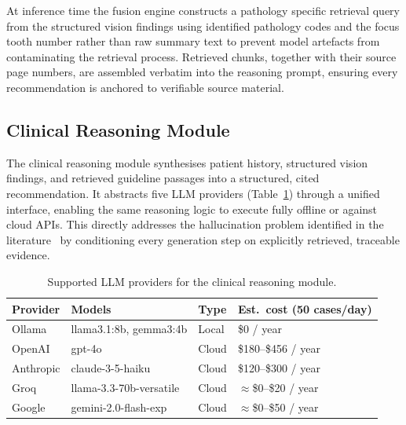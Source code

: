 \documentclass[12pt,a4paper]{report}
\begin{document}
	
	At inference time the fusion engine constructs a pathology specific retrieval query from
	the structured vision findings using identified pathology codes and the focus tooth number
	rather than raw summary text to prevent model artefacts from contaminating the retrieval
	process. Retrieved chunks, together with their source page numbers, are assembled verbatim
	into the reasoning prompt, ensuring every recommendation is anchored to verifiable source
	material.
	
	\subsection{Clinical Reasoning Module}
	\label{sec:reasoning}
	
	The clinical reasoning module synthesises patient history, structured vision findings, and
	retrieved guideline passages into a structured, cited recommendation. It abstracts five LLM
	providers (Table~\ref{tab:llm_providers}) through a unified interface, enabling the same
	reasoning logic to execute fully offline or against cloud APIs. This directly addresses the
	hallucination problem identified in the
	literature~\cite{ji2023survey, Wada2025RAGRadiology} by conditioning every generation step
	on explicitly retrieved, traceable evidence.
	
	\begin{table}[H]
		\centering
		\caption{Supported LLM providers for the clinical reasoning module.}
		\label{tab:llm_providers}
		{\small
			\begin{tabular}{p{2.0cm}p{4.0cm}p{1.8cm}p{3.8cm}}
				\toprule
				\textbf{Provider} & \textbf{Models} & \textbf{Type} & \textbf{Est.\ cost (50 cases/day)} \\
				\midrule
				Ollama    & llama3.1:8b, gemma3:4b         & Local  & \$0 / year \\
				OpenAI    & gpt-4o                         & Cloud  & \$180--\$456 / year \\
				Anthropic & claude-3-5-haiku              & Cloud  & \$120--\$300 / year \\
				Groq      & llama-3.3-70b-versatile        & Cloud  & $\approx$\$0--\$20 / year \\
				Google    & gemini-2.0-flash-exp           & Cloud  & $\approx$\$0--\$50 / year \\
				\bottomrule
			\end{tabular}
		}
	\end{table}
	
\end{document}

